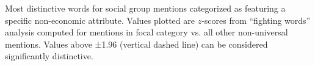 Most distinctive words for social group mentions categorized as featuring a specific non-economic attribute. Values plotted are $z$-scores from ``fighting words'' analysis computed for mentions in focal category vs. all other non-universal mentions. Values above ±1.96 (vertical dashed line) can be considered significantly distinctive.